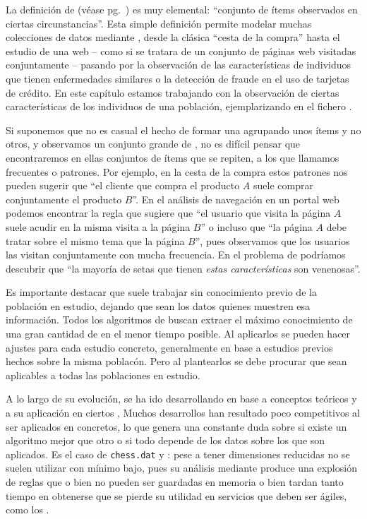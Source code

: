 La definición de \transaccion (véase pg.~\pageref{def:1:3:2:transaccion}) es muy elemental: "`conjunto de ítems observados en ciertas circunstancias"'. Esta simple definición permite modelar muchas colecciones de datos mediante \transacciones, desde la clásica "`cesta de la compra"' hasta el estudio de una \sn web -- como si se tratara de un conjunto de páginas web visitadas conjuntamente -- pasando por la observación de las características de individuos que tienen enfermedades similares o la detección de fraude en el uso de tarjetas de crédito. En este capítulo estamos trabajando con la observación de ciertas características de los individuos de una población, ejemplarizando en el fichero \mushroom.

Si suponemos que no es casual el hecho de formar una \transaccion agrupando unos ítems y no otros, y observamos un conjunto grande de \transacciones, no es difícil pensar que encontraremos en ellas conjuntos de ítems que se repiten, a los que llamamos \itemsets frecuentes o patrones. Por ejemplo, en la cesta de la compra estos patrones nos pueden sugerir que "`el cliente que compra el producto $A$ suele comprar conjuntamente el producto $B$"'. En el análisis de navegación en un portal web podemos encontrar la regla que sugiere que "`el usuario que visita la página $A$ suele acudir en la misma visita a la página $B$"' o incluso que "`la página $A$ debe tratar sobre el mismo tema que la página $B$"', pues observamos que los usuarios las visitan conjuntamente con mucha frecuencia. En el problema de \clasificacion podríamos descubrir que "`la mayoría de setas que tienen \emph{estas características} son venenosas"'.

Es importante destacar que \ARM suele trabajar sin conocimiento previo de la población en estudio, dejando que sean los datos quienes muestren esa información. Todos los algoritmos de \ARM buscan extraer el máximo conocimiento de una gran cantidad de \transacciones en el menor tiempo posible. Al aplicarlos se pueden hacer ajustes para cada estudio concreto, generalmente en base a estudios previos hechos sobre la misma poblacón. Pero al plantearlos se debe procurar que sean aplicables a todas las poblaciones en estudio.

A lo largo de su evolución, \ARM se ha ido desarrollando en base a conceptos teóricos y a su aplicación en ciertos \datasets, Muchos desarrollos han resultado poco competitivos al ser aplicados en \datasets concretos, lo que genera una constante duda sobre si existe un algoritmo mejor que otro o si todo depende de los datos sobre los que son aplicados. Es el caso de \texttt{chess.dat} y \mushroom: pese a tener dimensiones reducidas no se suelen utilizar con \soporte mínimo bajo, pues su análisis mediante \ARM produce una explosión de reglas que o bien no pueden ser guardadas en memoria o bien tardan tanto tiempo en obtenerse que se pierde su utilidad en servicios que deben ser ágiles, como los \sr.

